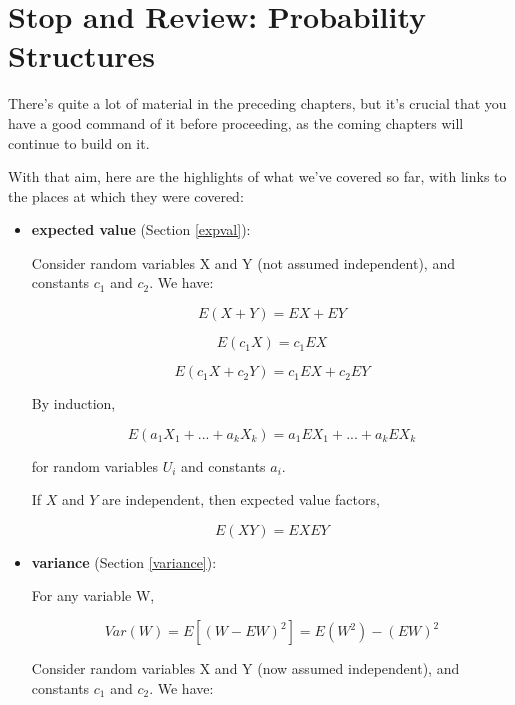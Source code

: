 \chapter{Stop and Review:  Probability Structures}
\label{stopandreview}

There's quite a lot of material in the preceding chapters, but it's
crucial that you have a good command of it before proceeding, as the
coming chapters will continue to build on it.

With that aim, here are the highlights of what we've covered so far,
with links to the places at which they were covered:

\begin{itemize}

\item {\bf expected value} (Section \ref{expval}):

Consider random variables X and Y (not assumed independent), and 
constants $c_1$ and $c_2$.  We have:

\begin{equation}
E(X + Y) = EX + EY
\end{equation}

\begin{equation}
E(c_1 X) = c_1 EX
\end{equation}

\begin{equation}
E(c_1 X + c_2 Y) = c_1 EX + c_2 EY
\end{equation}

By induction,

\begin{equation}
E(a_1 X_1 + ... + a_k X_k) = a_1 EX_1 + ... + a_k EX_k
\end{equation}

for random variables $U_i$ and constants $a_i$.

If $X$ and $Y$ are independent, then expected value factors,

\begin{equation}
E(XY) = EX EY
\end{equation}

\item {\bf variance} (Section \ref{variance}):

For any variable W,

\begin{equation}
Var(W) = E[(W - EW)^2] = E(W^2) - (EW)^2
\end{equation}

Consider random variables X and Y (now assumed independent), and 
constants $c_1$ and $c_2$.  We have:


\end{itemize}
